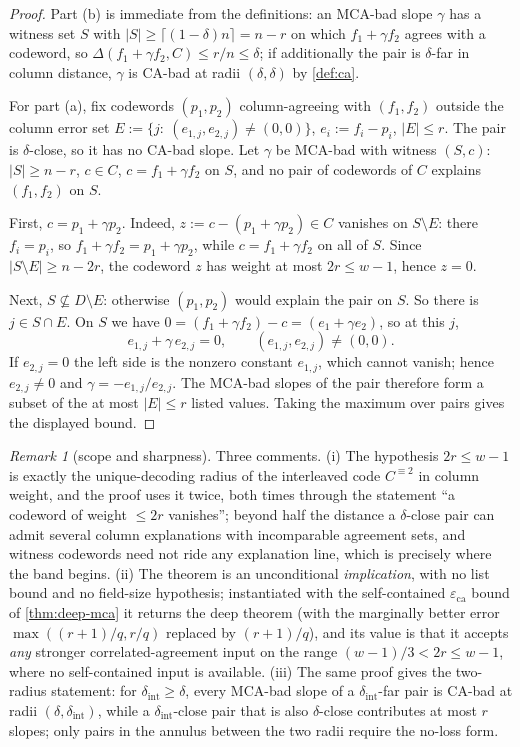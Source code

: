 \documentclass[11pt]{article}
\theoremstyle{definition}
\theoremstyle{remark}
\newtheorem{remark}[theorem]{Remark}
\newcommand{\eca}{\varepsilon_{\mathrm{ca}}}
\newcommand{\dist}{\Delta}
\begin{document}
\begin{proof}
Part \textup{(b)} is immediate from the definitions: an MCA-bad slope $\gamma$ has a witness set $S$ with $|S|\ge\lceil(1-\delta)n\rceil=n-r$ on which $f_1+\gamma f_2$ agrees with a codeword, so $\dist(f_1+\gamma f_2,C)\le r/n\le\delta$; if additionally the pair is $\delta$-far in column distance, $\gamma$ is CA-bad at radii $(\delta,\delta)$ by \cref{def:ca}.

For part \textup{(a)}, fix codewords $(p_1,p_2)$ column-agreeing with $(f_1,f_2)$ outside the column error set $E:=\{j:\ (e_{1,j},e_{2,j})\ne(0,0)\}$, $e_i:=f_i-p_i$, $|E|\le r$. The pair is $\delta$-close, so it has no CA-bad slope. Let $\gamma$ be MCA-bad with witness $(S,c)$: $|S|\ge n-r$, $c\in C$, $c=f_1+\gamma f_2$ on $S$, and no pair of codewords of $C$ explains $(f_1,f_2)$ on $S$.

First, $c=p_1+\gamma p_2$. Indeed, $z:=c-(p_1+\gamma p_2)\in C$ vanishes on $S\setminus E$: there $f_i=p_i$, so $f_1+\gamma f_2=p_1+\gamma p_2$, while $c=f_1+\gamma f_2$ on all of $S$. Since $|S\setminus E|\ge n-2r$, the codeword $z$ has weight at most $2r\le w-1$, hence $z=0$.

Next, $S\not\subseteq D\setminus E$: otherwise $(p_1,p_2)$ would explain the pair on $S$. So there is $j\in S\cap E$. On $S$ we have $0=(f_1+\gamma f_2)-c=(e_1+\gamma e_2)$, so at this $j$,
\[
e_{1,j}+\gamma\,e_{2,j}=0,\qquad (e_{1,j},e_{2,j})\ne(0,0).
\]
If $e_{2,j}=0$ the left side is the nonzero constant $e_{1,j}$, which cannot vanish; hence $e_{2,j}\ne0$ and $\gamma=-e_{1,j}/e_{2,j}$. The MCA-bad slopes of the pair therefore form a subset of the at most $|E|\le r$ listed values. Taking the maximum over pairs gives the displayed bound.
\end{proof}

\begin{remark}[scope and sharpness]\label{rem:half-scope}
Three comments. \textup{(i)} The hypothesis $2r\le w-1$ is exactly the unique-decoding radius of the interleaved code $C^{\equiv2}$ in column weight, and the proof uses it twice, both times through the statement ``a codeword of weight $\le 2r$ vanishes''; beyond half the distance a $\delta$-close pair can admit several column explanations with incomparable agreement sets, and witness codewords need not ride any explanation line, which is precisely where the band begins. \textup{(ii)} The theorem is an unconditional \emph{implication}, with no list bound and no field-size hypothesis; instantiated with the self-contained $\eca$ bound of \cref{thm:deep-mca} it returns the deep theorem (with the marginally better error $\max((r+1)/q,r/q)$ replaced by $(r+1)/q$), and its value is that it accepts \emph{any} stronger correlated-agreement input on the range $(w-1)/3<2r\le w-1$, where no self-contained input is available. \textup{(iii)} The same proof gives the two-radius statement: for $\delta_{\mathrm{int}}\ge\delta$, every MCA-bad slope of a $\delta_{\mathrm{int}}$-far pair is CA-bad at radii $(\delta,\delta_{\mathrm{int}})$, while a $\delta_{\mathrm{int}}$-close pair that is also $\delta$-close contributes at most $r$ slopes; only pairs in the annulus between the two radii require the no-loss form.
\end{remark}
\end{document}
